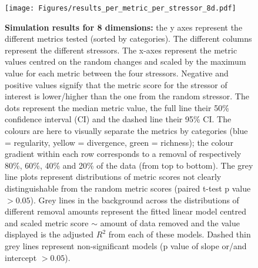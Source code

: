 \documentclass[12pt,letterpaper]{article}
\begin{document}
\begin{figure}[!htbp]
\centering
   \texttt{[image: Figures/results\_per\_metric\_per\_stressor\_8d.pdf]}
\caption{\scriptsize{\textbf{Simulation results for 8 dimensions:} the y axes represent the different metrics tested (sorted by categories).
The different columns represent the different stressors. The x-axes represent the metric values centred on the random changes and scaled by the maximum value for each metric between the four stressors.
Negative and positive values signify that the metric score for the stressor of interest is lower/higher than the one from the random stressor.
The dots represent the median metric value, the full line their 50\% confidence interval (CI) and the dashed line their 95\% CI.
The colours are here to visually separate the metrics by categories (blue = regularity, yellow = divergence, green = richness); the colour gradient within each row corresponds to a removal of respectively 80\%, 60\%, 40\% and 20\% of the data (from top to bottom).
The grey line plots represent distributions of metric scores not clearly distinguishable from the random metric scores (paired t-test p value $> 0.05$).
Grey lines in the background across the distributions of different removal amounts represent the fitted linear model centred and scaled metric score $\sim$ amount of data removed and the value displayed is the adjusted $R^2$ from each of these models.
Dashed thin grey lines represent non-significant models (p value of slope or/and intercept $> 0.05$).
}}
\label{Fig:simulation_results_8d}
\end{figure}
\bigskip
\end{document}
